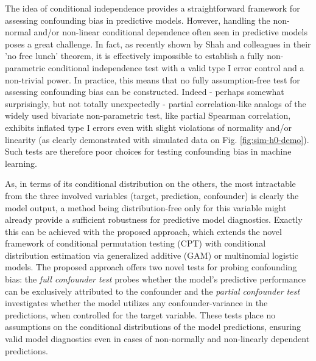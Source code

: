 \documentclass{article}
\begin{document}
The idea of conditional independence provides a straightforward framework for assessing confounding bias in predictive models. However, handling the non-normal and/or non-linear conditional dependence often seen in predictive models\citep{garcia2009study, kristensen2017whole} poses a great challenge.
In fact, as recently shown by Shah and colleagues\cite{shah2020hardness} in their 'no free lunch' theorem, it is effectively impossible to establish a fully non-parametric conditional independence test with a valid type I error control and a non-trivial power. In practice, this means that no fully assumption-free test for assessing confounding bias can be constructed. Indeed - perhaps somewhat surprisingly, but not totally unexpectedly\cite{korn1984ranges} - partial correlation-like analogs of the widely used bivariate non-parametric test, like partial Spearman correlation, exhibits inflated type I errors even with slight violations of normality and/or linearity (as clearly demonstrated with simulated data on Fig. \ref{fig:sim-h0-demo}). Such tests are therefore poor choices for testing confounding bias in machine learning.

As, in terms of its conditional distribution on the others, the most intractable from the three involved variables (target, prediction, confounder) is clearly the model output\citep{garcia2009study, kristensen2017whole}, a method being distribution-free only for this variable might already provide a sufficient robustness for predictive model diagnostics. Exactly this can be achieved with the proposed approach, which extends the novel framework of conditional permutation testing (CPT)\cite{berrett2020conditional} with conditional distribution estimation via generalized additive (GAM)\citep{hastie1987generalized} or multinomial logistic models\cite{bennett1966multiple, jones1975proability}. The proposed approach offers two novel tests for probing confounding bias: the \emph{full confounder test} probes whether the model's predictive performance can be exclusively attributed to the confounder and the \emph{partial confounder test} investigates whether the model utilizes any confounder-variance in the predictions, when controlled for the target variable.
These tests place no assumptions on the conditional distributions of the model predictions, ensuring valid model diagnostics even in cases of non-normally and non-linearly dependent predictions.
\end{document}
